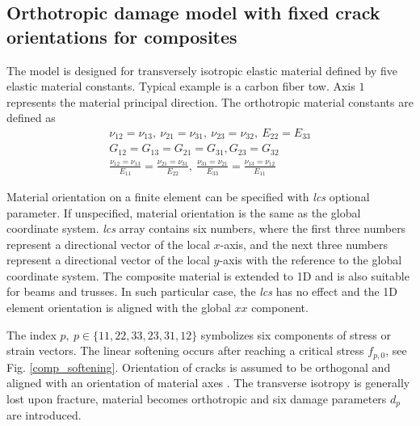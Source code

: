 \documentclass[a4paper]{article}
\newcommand{\param}[1]{{\it #1}}
\begin{document}
\subsection{Orthotropic damage model with fixed crack orientations for composites}

The model is designed for transversely isotropic elastic material defined by five elastic material constants. Typical example is a carbon fiber tow. Axis $1$ represents the material principal direction. The orthotropic material constants are defined as
\begin{eqnarray}
\nu_{12}=\nu_{13},~\nu_{21}=\nu_{31},~\nu_{23}=\nu_{32},~E_{22}=E_{33}\\
G_{12}=G_{13}=G_{21}=G_{31},G_{23}=G_{32}\\
\frac{\nu_{12}=\nu_{13}}{E_{11}} = \frac{\nu_{21}=\nu_{31}}{E_{22}},~\frac{\nu_{31}=\nu_{21}}{E_{33}} = \frac{\nu_{13}=\nu_{12}}{E_{11}}
\end{eqnarray}

Material orientation on a finite element can be specified with \param{lcs} optional parameter. If unspecified, material orientation is the same as the global coordinate system. \param{lcs} array contains six numbers,
where the first three numbers represent a directional vector of the local $x$-axis, and the next three numbers represent a directional vector of the local $y$-axis with the reference to the global coordinate system. The composite material is extended to 1D and is also suitable for beams and trusses. In such particular case, the \param{lcs} has no effect and the 1D element orientation is aligned with the global $xx$ component.

The index $p,~p\in\{11,22,33,23,31,12\}$ symbolizes six components of stress or strain vectors. The linear softening occurs after reaching a critical stress $f_{p,0}$, see Fig. \ref{comp_softening}. Orientation of cracks is assumed to be orthogonal and aligned with an orientation of material axes \cite[pp.236]{Bazant:98}. The transverse isotropy is generally lost upon fracture, material becomes orthotropic and six damage parameters $d_p$ are introduced.
\end{document}

